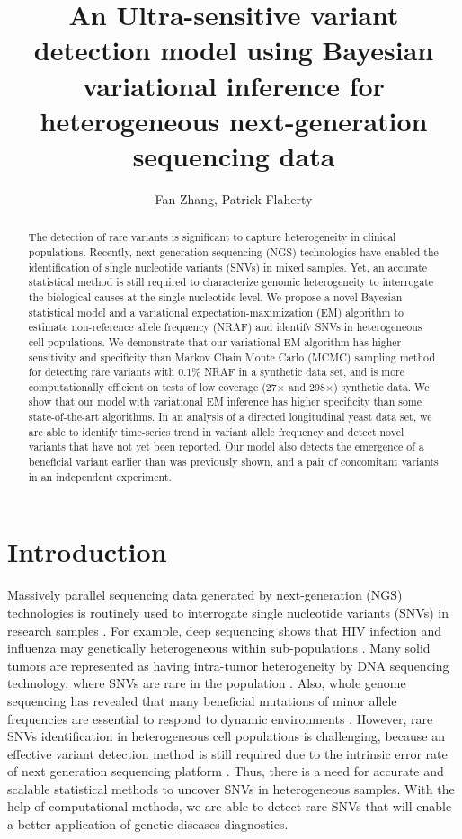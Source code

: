 \documentclass[11pt,reqno]{amsart}
\title[]{An Ultra-sensitive variant detection model using Bayesian variational inference for heterogeneous next-generation sequencing data}
\author{Fan Zhang, Patrick Flaherty}
\begin{document}
\maketitle

\begin{abstract}
The detection of rare variants is significant to capture heterogeneity in clinical populations.
Recently, next-generation sequencing (NGS) technologies have enabled the identification of single nucleotide variants (SNVs) in mixed samples.
Yet, an accurate statistical method is still required to characterize genomic heterogeneity to interrogate the biological causes at the single nucleotide level.
We propose a novel Bayesian statistical model and a variational expectation-maximization (EM) algorithm to estimate non-reference allele frequency (NRAF) and identify SNVs in heterogeneous cell populations.
We demonstrate that our variational EM algorithm has higher sensitivity and specificity than Markov Chain Monte Carlo (MCMC) sampling method for detecting rare variants with 0.1\% NRAF in a synthetic data set,
and is more computationally efficient on tests of low coverage (27$\times$ and 298$\times$) synthetic data.
We show that our model with variational EM inference has higher specificity than some state-of-the-art algorithms.
In an analysis of a directed longitudinal yeast data set, we are able to identify time-series trend in variant allele frequency and detect novel variants that have not yet been reported.
Our model also detects the emergence of a beneficial variant earlier than was previously shown, and a pair of concomitant variants in an independent experiment.
\end{abstract}
\section{Introduction}
Massively parallel sequencing data generated by next-generation (NGS) technologies is routinely used to interrogate single nucleotide variants (SNVs) in research samples \citep{koboldt2013next}.
For example, deep sequencing shows that HIV infection and influenza may genetically heterogeneous within sub-populations \citep{flaherty2011ultrasensitive}.
Many solid tumors are represented as having intra-tumor heterogeneity by DNA sequencing technology, where SNVs are rare in the population \citep{navin2010inferring}.
Also, whole genome sequencing has revealed that many beneficial mutations of minor allele frequencies are essential to respond to dynamic environments \citep{kvitek2013whole}.
However, rare SNVs identification in heterogeneous cell populations is challenging, because an effective variant detection method is still required due to the intrinsic error rate of next generation sequencing platform \citep{shendure2008next}.
Thus, there is a need for accurate and scalable statistical methods to uncover SNVs in heterogeneous samples.
With the help of computational methods, we are able to detect rare SNVs that will enable a better application of genetic diseases diagnostics.
\end{document}
